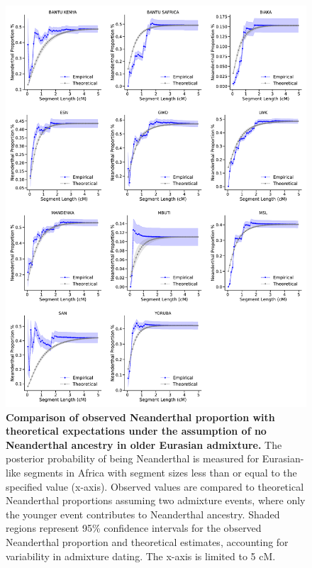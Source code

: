 \begin{figure}
    \centering
    \includegraphics[width=\textwidth]{figures/gb_bta/gb_real_bta_16.pdf}
    \caption{\textbf{Comparison of observed Neanderthal proportion with theoretical expectations under the assumption of no Neanderthal ancestry in older Eurasian admixture.} The posterior probability of being Neanderthal is measured for Eurasian-like segments in Africa with segment sizes less than or equal to the specified value (x-axis). Observed values are compared to theoretical Neanderthal proportions assuming two admixture events, where only the younger event contributes to Neanderthal ancestry. Shaded regions represent 95\% confidence intervals for the observed Neanderthal proportion and theoretical estimates, accounting for variability in admixture dating. The x-axis is limited to 5 cM.}
    \label{fig:gb-bta-nea-supp}
\end{figure}

